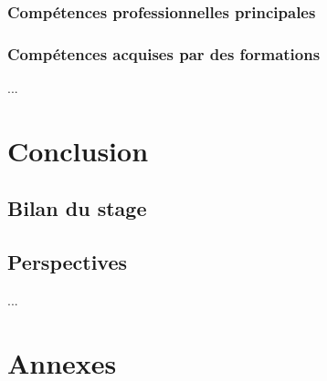 \documentclass[12pt,a4paper]{report}
\begin{document}
\subsection{Compétences professionnelles principales}
\subsection{Compétences acquises par des formations}


... %

\chapter{Conclusion}
\section{Bilan du stage}
\section{Perspectives}
... %

\appendix
\chapter{Annexes}
\end{document}

